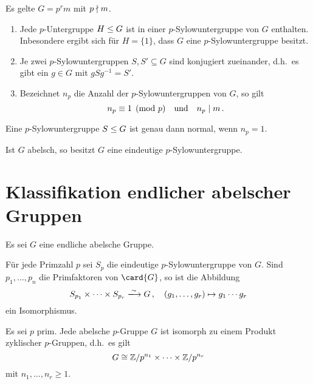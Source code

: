 \begin{theorem}[Sylowsätze]
  Es gelte $G = p^r m$ mit $p \mathrel{\nmid} m$.
  \begin{enumerate}
    \item
      Jede $p$-Untergruppe $H \mathrel{\leq} G$ ist in einer $p$-Sylowuntergruppe von $G$ enthalten.
      Inbesondere ergibt sich für $H = \{1\}$, dass $G$ eine $p$-Sylowuntergruppe besitzt.
    \item
      Je zwei $p$-Sylowuntergruppen $S, S' \subseteq G$ sind konjugiert zueinander, d.h.\ es gibt ein $g \in G$ mit $g S g^{-1} = S'$.
    \item
      Bezeichnet $n_p$ die Anzahl der $p$-Sylowuntergruppen von $G$, so gilt
      \[
                n_p
        \equiv  1
        \pmod{p}
        \quad\text{und}\quad
        n_p \mathrel{|} m \,.
      \]
  \end{enumerate}
\end{theorem}

\begin{corollary}
  Eine $p$-Sylowuntergruppe $S \mathrel{\leq} G$ ist genau dann normal, wenn $n_p = 1$.
\end{corollary}

\begin{corollary}
  Ist $G$ abelsch, so besitzt $G$ eine eindeutige $p$-Sylowuntergruppe.
\end{corollary}





\section{Klassifikation endlicher abelscher Gruppen}

Es sei $G$ eine endliche abelsche Gruppe.

\begin{theorem}
  Für jede Primzahl $p$ sei $S_p$ die eindeutige $p$-Sylowuntergruppe von $G$.
  Sind $p_1, \dotsc, p_n$ die Primfaktoren von $\card{G}$, so ist die Abbildung
  \[
                            S_{p_1} \times \dotsb \times S_{p_r}
    \xlongrightarrow{\sim}  G \,,
    \quad                   (g_1, \dotsc, g_r)
    \mapsto                 g_1 \dotsm g_r
  \]
  ein Isomorphismus.
\end{theorem}

\begin{proposition}
  Es sei $p$ prim.
  Jede abelsche $p$-Gruppe $G$ ist isomorph zu einem Produkt zyklischer $p$-Gruppen, d.h.\ es gilt
  \[
          G
    \cong \mathbb{Z}/p^{n_1} \times \dotsm \times \mathbb{Z}/p^{n_r}
  \]
  mit $n_1, \dotsc, n_r \geq 1$.
\end{proposition}

